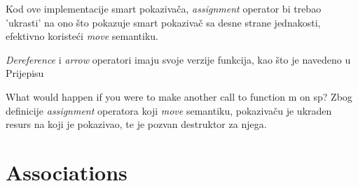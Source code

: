\begin{codelisting}
	
\end{codelisting}

Kod ove implementacije smart pokazivača, \emph{assignment} operator bi trebao 'ukrasti' na ono što pokazuje smart pokazivač sa desne strane jednakosti, efektivno koristeći \emph{move} semantiku.

\begin{codesection}
	
\end{codesection}

\emph{Dereference} i \emph{arrow} operatori imaju svoje  verzije funkcija, kao što je navedeno u Prijepisu 

\begin{codesection}
	
\end{codesection}

\begin{codesection}
	
\end{codesection}

\QandA
{What would happen if you were to make another call to function m on sp?}
{Zbog definicije \emph{assignment} operatora koji \emph{move} semantiku,  pokazivaču je ukraden resurs na koji je pokazivao, te je pozvan destruktor za njega.}
\begin{codesection}
	
\end{codesection}

\begin{codesection}
	
\end{codesection}

\pagebreak

\section{Associations}
\label{sec:assoc}
\setcounter{lstlisting}{0}

